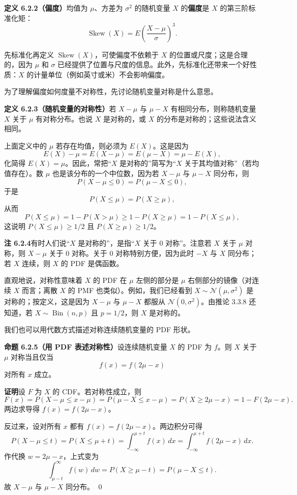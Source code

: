 \documentclass[UTF8,12pt,a4paper,fontset=fandol]{ctexart}
\begin{document}
\noindent\textbf{定义 6.2.2（偏度）}\quad 均值为 $\mu$、方差为 $\sigma^2$ 的随机变量 $X$ 的\textbf{偏度}是 $X$ 的第三阶标准化矩：
\[
  \operatorname{Skew}(X)
  =
  E\left(\frac{X-\mu}{\sigma}\right)^3.
\]

先标准化再定义 $\operatorname{Skew}(X)$，可使偏度不依赖于 $X$ 的位置或尺度；这是合理的，因为 $\mu$ 和 $\sigma$ 已经提供了位置与尺度的信息。此外，先标准化还带来一个好性质：$X$ 的计量单位（例如英寸或米）不会影响偏度。

为了理解偏度如何度量不对称性，先讨论随机变量对称是什么意思。

\noindent\textbf{定义 6.2.3（随机变量的对称性）}\quad 若 $X-\mu$ 与 $\mu-X$ 有相同分布，则称随机变量 $X$ 关于 $\mu$ 有对称分布。也说 $X$ 是对称的，或 $X$ 的分布是对称的；这些说法含义相同。

上面定义中的 $\mu$ 若存在均值，则必须为 $E(X)$。这是因为
\[
  E(X)-\mu=E(X-\mu)=E(\mu-X)=\mu-E(X),
\]
化简得 $E(X)=\mu$。因此，常把“$X$ 是对称的”简写为“$X$ 关于其均值对称”（若均值存在）。数 $\mu$ 也是该分布的一个中位数，因为若 $X-\mu$ 与 $\mu-X$ 同分布，则
\[
  P(X-\mu\le0)=P(\mu-X\le0),
\]
于是
\[
  P(X\le\mu)=P(X\ge\mu),
\]
从而
\[
  P(X\le\mu)=1-P(X>\mu)\ge1-P(X\ge\mu)=1-P(X\le\mu),
\]
这说明 $P(X\le\mu)\ge1/2$ 且 $P(X\ge\mu)\ge1/2$。

\noindent\textbf{注 6.2.4}\quad 有时人们说“$X$ 是对称的”，是指“$X$ 关于 $0$ 对称”。注意若 $X$ 关于 $\mu$ 对称，则 $X-\mu$ 关于 $0$ 对称。关于 $0$ 对称特别方便，因为此时 $-X$ 与 $X$ 同分布；若 $X$ 连续，则 $X$ 的 PDF 是偶函数。

直观地说，对称性意味着 $X$ 的 PDF 在 $\mu$ 左侧的部分是 $\mu$ 右侧部分的镜像（对连续 $X$ 而言；离散 $X$ 的 PMF 也类似）。例如，我们已经看到 $X\sim\mathcal{N}(\mu,\sigma^2)$ 是对称的；按定义，这是因为 $X-\mu$ 与 $\mu-X$ 都服从 $\mathcal{N}(0,\sigma^2)$。由推论 3.3.8 还知道，若 $X\sim\operatorname{Bin}(n,p)$ 且 $p=1/2$，则 $X$ 是对称的。

我们也可以用代数方式描述对称连续随机变量的 PDF 形状。

\noindent\textbf{命题 6.2.5（用 PDF 表述对称性）}\quad 设连续随机变量 $X$ 的 PDF 为 $f$。则 $X$ 关于 $\mu$ 对称当且仅当
\[
  f(x)=f(2\mu-x)
\]
对所有 $x$ 成立。

\noindent\textbf{证明}\quad 设 $F$ 为 $X$ 的 CDF。若对称性成立，则
\[
  F(x)=P(X-\mu\le x-\mu)
  =P(\mu-X\le x-\mu)
  =P(X\ge2\mu-x)=1-F(2\mu-x).
\]
两边求导得 $f(x)=f(2\mu-x)$。

反过来，设对所有 $x$ 都有 $f(x)=f(2\mu-x)$。两边积分可得
\[
  P(X-\mu\le t)=P(X\le\mu+t)
  =\int_{-\infty}^{\mu+t}f(x)\,dx
  =\int_{-\infty}^{\mu+t}f(2\mu-x)\,dx.
\]
作代换 $w=2\mu-x$，上式变为
\[
  \int_{\mu-t}^{\infty}f(w)\,dw
  =P(X\ge\mu-t)=P(\mu-X\le t).
\]
故 $X-\mu$ 与 $\mu-X$ 同分布。
\qed
\end{document}

